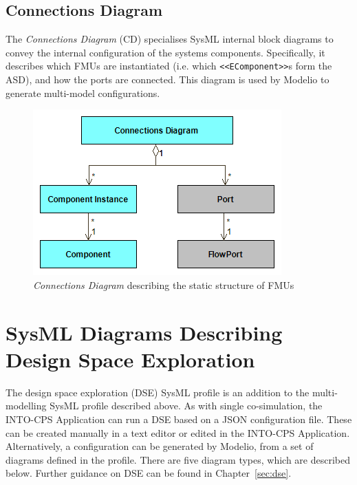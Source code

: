 
\subsection{Connections Diagram}
\label{sec:sysml:intocps:cd}

The \emph{Connections Diagram} (CD) specialises SysML internal block diagrams to convey the internal configuration of the systems components. Specifically, it describes which FMUs are instantiated (i.e. which \texttt{<<EComponent>>}s form the ASD), and how the ports are connected. This diagram is used by Modelio to generate multi-model configurations.

\begin{figure}[h!]
\centering
\includegraphics[scale=0.6]{figures/Architecting/ConnectionsView}
\caption{\emph{Connections Diagram} describing the static structure of FMUs}
\label{fig:sysmlintocps:cd}
\end{figure}

\section{SysML Diagrams Describing Design Space Exploration}
\label{sec:sysml:dse}

The design space exploration (DSE) SysML profile is an addition to the multi-modelling SysML profile described above. As with single co-simulation, the INTO-CPS Application can run a DSE based on a JSON configuration file. These can be created manually in a text editor or edited in the INTO-CPS Application. Alternatively, a configuration can be generated by Modelio, from a set of diagrams defined in the profile. There are five diagram types, which are described below. Further guidance on DSE can be found in Chapter~\ref{sec:dse}.

